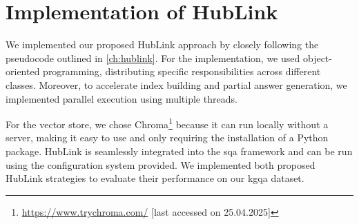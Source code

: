 
\section{Implementation of HubLink}
\label{sec:implementation_hublink}

We implemented our proposed HubLink approach by closely following the pseudocode outlined in \autoref{ch:hublink}. For the implementation, we used object-oriented programming, distributing specific responsibilities across different classes. Moreover, to accelerate index building and partial answer generation, we implemented parallel execution using multiple threads.

For the vector store, we chose Chroma\footnote{\url{https://www.trychroma.com/} [last accessed on 25.04.2025]} because it can run locally without a server, making it easy to use and only requiring the installation of a Python package. HubLink is seamlessly integrated into the \gls{sqa} framework and can be run using the configuration system provided. We implemented both proposed HubLink strategies to evaluate their performance on our \gls{kgqa} dataset.